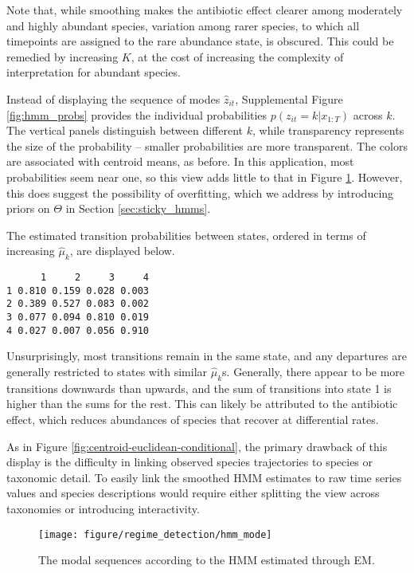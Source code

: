 Note that, while smoothing makes the antibiotic effect clearer among moderately
and highly abundant species, variation among rarer species, to which all
timepoints are assigned to the rare abundance state, is obscured. This could be
remedied by increasing $K$, at the cost of increasing the complexity of
interpretation for abundant species.

Instead of displaying the sequence of modes $\hat{z}_{it}$, Supplemental Figure
\ref{fig:hmm_probs} provides the individual probabilities $p\left(z_{it} = k
\vert x_{1:T}\right)$ across $k$. The vertical panels distinguish between
different $k$, while transparency represents the size of the probability --
smaller probabilities are more transparent. The colors are associated with
centroid means, as before. In this application, most probabilities seem near
one, so this view adds little to that in Figure \ref{fig:hmm_mode}. However,
this does suggest the possibility of overfitting, which we address by
introducing priors on $\Theta$ in Section \ref{sec:sticky_hmms}.

The estimated transition probabilities between states, ordered in terms of
increasing $\hat{\mu}_{k}$, are displayed below.
\begin{verbatim}
      1     2     3     4
1 0.810 0.159 0.028 0.003
2 0.389 0.527 0.083 0.002
3 0.077 0.094 0.810 0.019
4 0.027 0.007 0.056 0.910
\end{verbatim}
Unsurprisingly, most transitions remain in the same state, and any departures
are generally restricted to states with similar $\hat{\mu}_{k}$s. Generally,
there appear to be more transitions downwards than upwards, and the sum of
transitions into state 1 is higher than the sums for the rest. This can likely
be attributed to the antibiotic effect, which reduces abundances of species that
recover at differential rates.

As in Figure \ref{fig:centroid-euclidean-conditional}, the primary drawback of
this display is the difficulty in linking observed species trajectories to
species or taxonomic detail. To easily link the smoothed HMM estimates to raw
time series values and species descriptions would require either splitting the
view across taxonomies or introducing interactivity.

\begin{figure}
  \centering
  \texttt{[image: figure/regime\_detection/hmm\_mode]}
  \caption{The modal sequences according to the HMM estimated through
    EM. \label{fig:hmm_mode} }
\end{figure}

